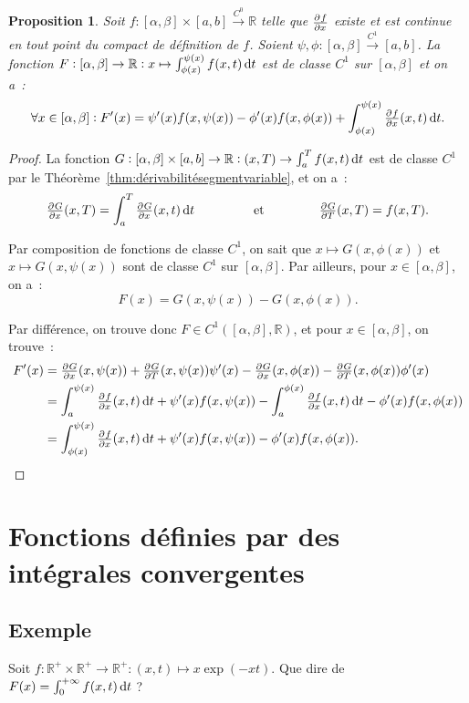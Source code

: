 \documentclass{report}
\newtheorem{prp}[thm]{Proposition}
\theoremstyle{definition}
\theoremstyle{remark}
\newcommand{\R}{\mathbb R}
\newcommand{\Rp}{\R^{+}}
\newcommand{\toC}[1]{\xrightarrow{C^{#1}}}
\newcommand{\tocont}{\toC 0}
\newcommand{\pinfty}{{+\infty}}
\begin{document}
			\begin{prp} Soit $f : [\alpha, \beta] \times [a, b] \tocont \R$ telle que $\pd fx$ existe et est continue en tout point du compact de définition de
			$f$. Soient $\psi, \phi : [\alpha, \beta] \toC1 [a, b]$. La fonction $F : [\alpha, \beta] \to \R : x \mapsto \int_{\phi(x)}^{\psi(x)}f(x, t)\dif t$
			est de classe $C^1$ sur $[\alpha, \beta]$ et on a~:
			\[\forall x \in [\alpha, \beta] : F'(x) = \psi'(x)f(x, \psi(x)) - \phi'(x)f(x, \phi(x)) + \int_{\phi(x)}^{\psi(x)}\pd fx(x, t)\dif t.\]
			\end{prp}

			\begin{proof} La fonction $G : [\alpha, \beta] \times [a, b] \to \R : (x, T) \to \int_a^Tf(x, t)\dif t$ est de classe $C^1$ par le
			Théorème~\ref{thm:dérivabilitésegmentvariable}, et on a~:
			\[\pd Gx(x, T) = \int_a^T\pd Gx(x, t)\dif t\ \qquad\qquad\text{ et }\qquad\qquad \pd GT(x, T) = f(x, T).\]

			Par composition de fonctions de classe $C^1$, on sait que $x \mapsto G(x, \phi(x))$ et $x \mapsto G(x, \psi(x))$ sont de classe $C^1$ sur
			$[\alpha, \beta]$. Par ailleurs, pour $x \in [\alpha, \beta]$, on a~:
			\[F(x) = G(x, \psi(x)) - G(x, \phi(x)).\]

			Par différence, on trouve donc $F \in C^1([\alpha, \beta], \R)$, et pour $x \in [\alpha, \beta]$, on trouve~:
			\begin{align*}
				F'(x) &= \pd Gx(x, \psi(x)) + \pd GT(x, \psi(x))\psi'(x) - \pd Gx(x, \phi(x)) - \pd GT(x, \phi(x))\phi'(x) \\
				&= \int_a^{\psi(x)}\pd fx(x, t)\dif t + \psi'(x)f(x, \psi(x)) - \int_a^{\phi(x)}\pd fx(x, t)\dif t - \phi'(x)f(x, \phi(x)) \\
				&= \int_{\phi(x)}^{\psi(x)}\pd fx(x, t)\dif t + \psi'(x)f(x, \psi(x)) - \phi'(x)f(x, \phi(x)).
			\end{align*}
			\end{proof}

	\section{Fonctions définies par des intégrales convergentes}
		\subsection{Exemple}\label{subsec:exempleintconv}
			Soit $f : \Rp \times \Rp \to \Rp : (x, t) \mapsto x\exp(-xt)$. Que dire de $F(x) = \int_0^\pinfty f(x, t)\dif t$ ?
\end{document}
